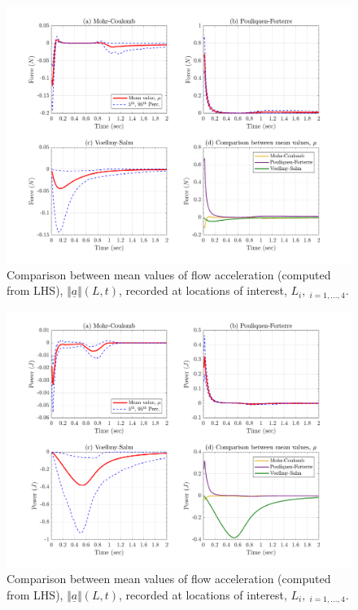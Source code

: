 \documentclass{article}
\begin{document}
\begin{itemize}
\begin{figure}[H]
        \centering
        \includegraphics[width=1\textwidth]{InclinedPlane/Forces_Powers/RHS4/FRHS4y.png}
        \caption{Comparison between mean values of flow acceleration (computed from LHS), $\Vert \underline{a} \Vert(L,t)$, recorded at locations of interest, $L_i, \ _{i=1,...,4}$.}
        \label{fig:Ramp-RHS4-Fy-spatial}
\end{figure}

\begin{figure}[H]
        \centering
        \includegraphics[width=1\textwidth]{InclinedPlane/Forces_Powers/RHS4/PRHS4.png}
        \caption{Comparison between mean values of flow acceleration (computed from LHS), $\Vert \underline{a} \Vert(L,t)$, recorded at locations of interest, $L_i, \ _{i=1,...,4}$.}
        \label{fig:Ramp-RHS4-Power-spatial}
\end{figure}

\end{itemize}
\end{document}
